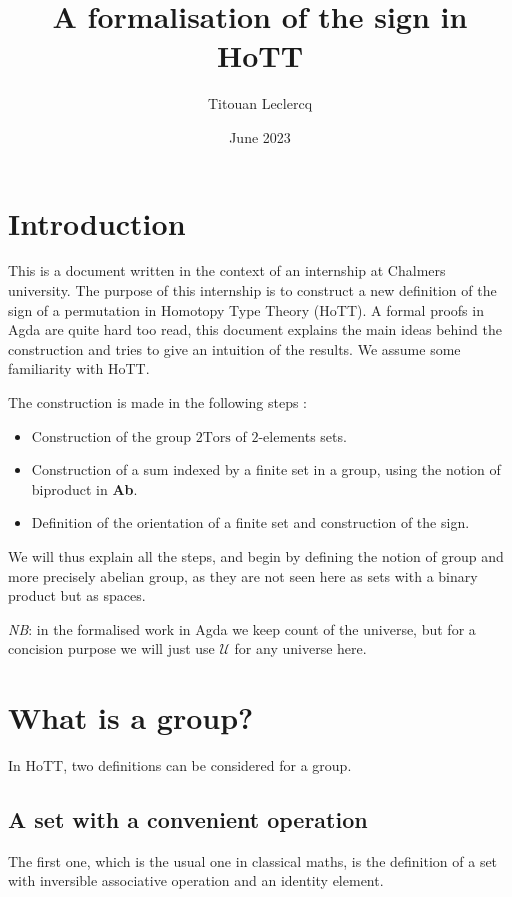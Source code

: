 \documentclass{article}
\title{A formalisation of the sign in HoTT}
\author{Titouan Leclercq}
\date{June 2023}
\newcommand{\twotors}[0]{2\mathrm{Tors}}
\begin{document}
\maketitle

\section{Introduction}

This is a document written in the context of an internship at Chalmers university. The purpose of this
internship is to construct a new definition of the sign of a permutation in Homotopy Type Theory (HoTT). A
formal proofs in Agda are quite hard too read, this document explains the main ideas behind the construction
and tries to give an intuition of the results. We assume some familiarity with HoTT.

The construction is made in the following steps :
\begin{itemize}
    \item Construction of the group $\twotors$ of $2$-elements sets.
    \item Construction of a sum indexed by a finite set in a group, using the notion of biproduct in
    \textbf{Ab}.
    \item Definition of the orientation of a finite set and construction of the sign.
\end{itemize}

We will thus explain all the steps, and begin by defining the notion of group and more precisely abelian
group, as they are not seen here as sets with a binary product but as spaces.

\textit{NB}: in the formalised work in Agda we keep count of the universe, but for a concision purpose we will
just use $\mathcal U$ for any universe here.

\section{What is a group?}

In HoTT, two definitions can be considered for a group.

\subsection{A set with a convenient operation}

The first one, which is the usual one in classical
maths, is the definition of a set with inversible associative operation and an identity element.
\end{document}
